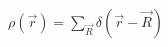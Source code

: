 \documentclass[preview]{standalone}
\begin{document}
\begin{align*}
\rho(\vec{r}) = \sum_{\vec{R}} \delta(\vec{r} - \vec{R})
\end{align*}
\end{document}
